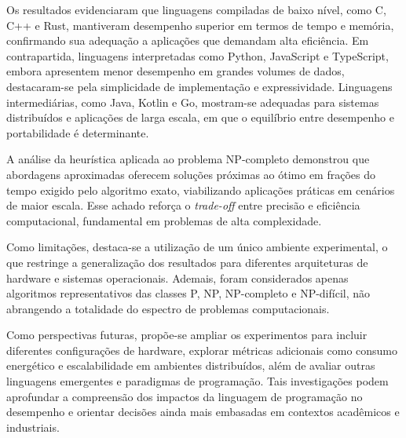 \documentclass[12pt,a4paper]{article}
\newcommand{\eng}[1]{\textit{#1}}
\begin{document}
Os resultados evidenciaram que linguagens compiladas de baixo nível, como C, C++ e Rust, mantiveram desempenho superior em termos de tempo e memória, confirmando sua adequação a aplicações que demandam alta eficiência. Em contrapartida, linguagens interpretadas como Python, JavaScript e TypeScript, embora apresentem menor desempenho em grandes volumes de dados, destacaram-se pela simplicidade de implementação e expressividade. Linguagens intermediárias, como Java, Kotlin e Go, mostram-se adequadas para sistemas distribuídos e aplicações de larga escala, em que o equilíbrio entre desempenho e portabilidade é determinante.

A análise da heurística aplicada ao problema NP-completo demonstrou que abordagens aproximadas oferecem soluções próximas ao ótimo em frações do tempo exigido pelo algoritmo exato, viabilizando aplicações práticas em cenários de maior escala. Esse achado reforça o \eng{trade-off} entre precisão e eficiência computacional, fundamental em problemas de alta complexidade.

Como limitações, destaca-se a utilização de um único ambiente experimental, o que restringe a generalização dos resultados para diferentes arquiteturas de hardware e sistemas operacionais. Ademais, foram considerados apenas algoritmos representativos das classes P, NP, NP-completo e NP-difícil, não abrangendo a totalidade do espectro de problemas computacionais.

Como perspectivas futuras, propõe-se ampliar os experimentos para incluir diferentes configurações de hardware, explorar métricas adicionais como consumo energético e escalabilidade em ambientes distribuídos, além de avaliar outras linguagens emergentes e paradigmas de programação. Tais investigações podem aprofundar a compreensão dos impactos da linguagem de programação no desempenho e orientar decisões ainda mais embasadas em contextos acadêmicos e industriais.

\renewcommand{\refname}{REFERÊNCIAS}
\begingroup
{}


\endgroup
\end{document}
